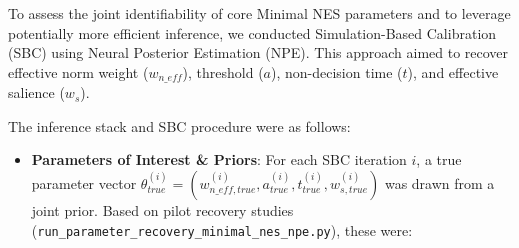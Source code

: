 \documentclass[
  11pt,
]{article}
\providecommand{\tightlist}{%
  \setlength{\itemsep}{0pt}\setlength{\parskip}{0pt}}
\begin{document}
To assess the joint identifiability of core Minimal NES parameters and
to leverage potentially more efficient inference, we conducted
Simulation-Based Calibration (SBC) using Neural Posterior Estimation
(NPE). This approach aimed to recover effective norm weight
(\(w_{n\_eff}\)), threshold (\(a\)), non-decision time (\(t\)), and
effective salience (\(w_s\)).

The inference stack and SBC procedure were as follows:

\begin{itemize}
\tightlist
\item
  \textbf{Parameters of Interest \& Priors}: For each SBC iteration
  \(i\), a true parameter vector
  \(\theta_{true}^{(i)} = (w_{n\_eff,true}^{(i)}, a_{true}^{(i)}, t_{true}^{(i)}, w_{s,true}^{(i)})\)
  was drawn from a joint prior. Based on pilot recovery studies
  (\texttt{run\_parameter\_recovery\_minimal\_nes\_npe.py}), these were:


\end{itemize}
\end{document}
